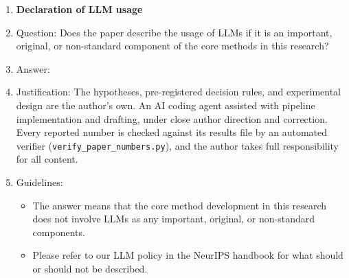 \documentclass{article}
\begin{document}
\begin{enumerate}
\item {\bf Declaration of LLM usage}
    \item[] Question: Does the paper describe the usage of LLMs if it is an important, original, or non-standard component of the core methods in this research?
    \item[] Answer: \answerYes{}
    \item[] Justification: The hypotheses, pre-registered decision rules, and experimental design are the author's own. An AI coding agent assisted with pipeline implementation and drafting, under close author direction and correction. Every reported number is checked against its results file by an automated verifier (\texttt{verify\_paper\_numbers.py}), and the author takes full responsibility for all content.
    \item[] Guidelines:
    \begin{itemize}
        \item The answer \answerNA{} means that the core method development in this research does not involve LLMs as any important, original, or non-standard components.
        \item Please refer to our LLM policy in the NeurIPS handbook for what should or should not be described.
    \end{itemize}

\end{enumerate}
\end{document}
